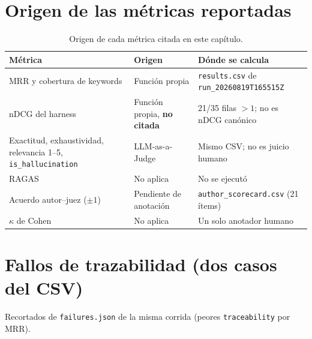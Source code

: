 \section{Origen de las métricas reportadas}
\begin{table}[htbp]
\centering
\caption{Origen de cada métrica citada en este capítulo.}
\label{tab:origen-metricas}
\begin{tabular}{p{4.4cm}p{4.0cm}p{5.4cm}}
\toprule
\textbf{Métrica} & \textbf{Origen} & \textbf{Dónde se calcula} \\
\midrule
MRR y cobertura de keywords & Función propia & \texttt{results.csv} de \texttt{run\_20260819T165515Z} \\
nDCG del harness & Función propia, \textbf{no citada} & 21/35 filas $>1$; no es nDCG canónico \\
Exactitud, exhaustividad, relevancia 1--5, \texttt{is\_hallucination} & LLM-as-a-Judge & Mismo CSV; no es juicio humano \\
RAGAS & No aplica & No se ejecutó \\
Acuerdo autor--juez ($\pm 1$) & Pendiente de anotación & \texttt{author\_scorecard.csv} (21 ítems) \\
$\kappa$ de Cohen & No aplica & Un solo anotador humano \\
\bottomrule
\end{tabular}
\end{table}

\section{Fallos de trazabilidad (dos casos del CSV)}
Recortados de \texttt{failures.json} de la misma corrida (peores \texttt{traceability} por MRR).

